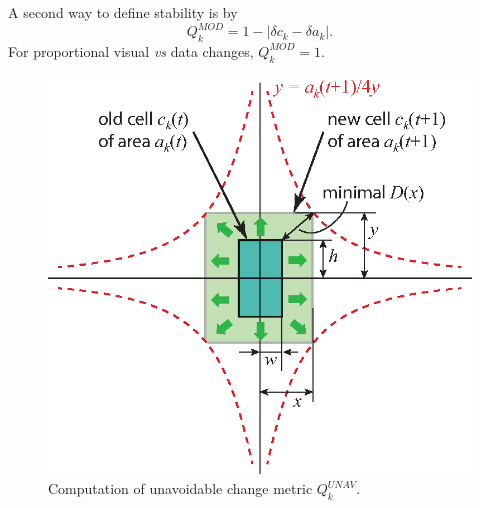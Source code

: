 \noindent A second way to define stability is by
%
\begin{equation}
Q^{MOD}_k = 1 - | \delta c_k - \delta a_k |.
\end{equation}
%
For proportional visual \emph{vs} data changes, $Q^{MOD}_k=1$.

\begin{figure}[htbp!]
\centering
\includegraphics[width=.6\textwidth]{figures/initial-treemap-evaluation/unavoidable.eps}
\vspace{-0.1cm}
\caption{Computation of unavoidable change metric $Q^{UNAV}_k$.}
\vspace{-0.2cm}
\label{fig:unavoidable}
\end{figure}



